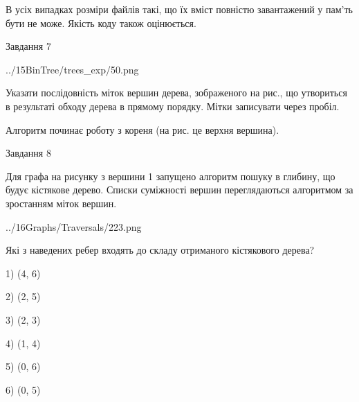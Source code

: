 \documentclass[12pt, ukrainian]{article}
\begin{document}
{В усіх випадках розміри файлів такі, що їх вміст повністю завантажений у пам'ть бути не може. Якість коду також оцінюється.



\vspace{10mm}\par

\newpage
\begin{minipage}[t]{9.7cm}
               
{\begin{center}Завдання {7}\end{center}}
\vspace{-4mm}

\begin{center}
	{../15BinTree/trees_exp/50.png}
\end{center}
Указати послідовність міток вершин дерева, зображеного на рис., що утвориться в результаті обходу дерева в прямому порядку. Мітки записувати через пробіл.\par Алгоритм починає роботу з кореня (на рис. це верхня вершина).\par

\end{minipage}
\vline \hspace{8mm}
\begin{minipage}[t]{8.0cm}
               
{\begin{center}Завдання {8}\end{center}}
\vspace{-4mm}
Для графа на рисунку з вершини 1 запущено алгоритм пошуку в глибину, що будує кістякове дерево. Списки суміжності вершин переглядаються алгоритмом за зростанням міток вершин.\par
\begin{center}
	{../16Graphs/Traversals/223.png}
\end{center}
\par Які з наведених ребер входять до складу отриманого кістякового дерева?\par
1) (4, 6)\par
2) (2, 5)\par
3) (2, 3)\par
4) (1, 4)\par
5) (0, 6)\par
6) (0, 5)\par
{\vskip 15pt} \par


\end{minipage}}
\end{document}
